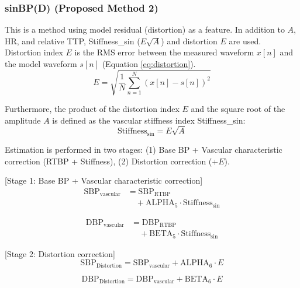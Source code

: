 \documentclass[fleqn,10pt,twocolumn]{AROB}
\begin{document}
\subsubsection{sinBP(D) (Proposed Method 2)}
This is a method using model residual (distortion) as a feature. In addition to $A$, HR, and relative TTP, Stiffness\_sin ($E\sqrt{A}$) and distortion $E$ are used.
Distortion index $E$ is the RMS error between the measured waveform $x[n]$ and the model waveform $s[n]$ (Equation \ref{eq:distortion}).
\begin{equation}
E = \sqrt{\frac{1}{N} \sum_{n=1}^{N} (x[n] - s[n])^2}
\label{eq:distortion}
\end{equation}

Furthermore, the product of the distortion index $E$ and the square root of the amplitude $A$ is defined as the vascular stiffness index Stiffness\_sin:
\begin{equation}
\text{Stiffness}_{\text{sin}} = E \sqrt{A}
\label{eq:stiffness}
\end{equation}

Estimation is performed in two stages: (1) Base BP + Vascular characteristic correction (RTBP + Stiffness), (2) Distortion correction (+$E$).

[Stage 1: Base BP + Vascular characteristic correction]
\begin{equation}
\begin{split}
\text{SBP}_{\text{vascular}} &= \text{SBP}_{\text{RTBP}} \\
&\quad + \text{ALPHA}_5 \cdot \text{Stiffness}_{\text{sin}}
\end{split}
\label{eq:sinbp_d_sbp_model}
\end{equation}

\begin{equation}
\begin{split}
\text{DBP}_{\text{vascular}} &= \text{DBP}_{\text{RTBP}} \\
&\quad + \text{BETA}_5 \cdot \text{Stiffness}_{\text{sin}}
\end{split}
\label{eq:sinbp_d_dbp_model}
\end{equation}

[Stage 2: Distortion correction]
\begin{equation}
\text{SBP}_{\text{Distortion}} = \text{SBP}_{\text{vascular}} + \text{ALPHA}_6 \cdot E
\label{eq:sinbp_d_sbp_final}
\end{equation}

\begin{equation}
\text{DBP}_{\text{Distortion}} = \text{DBP}_{\text{vascular}} + \text{BETA}_6 \cdot E
\label{eq:sinbp_d_dbp_final}
\end{equation}
\end{document}
